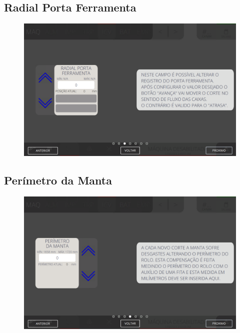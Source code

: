 \newpage
\thispagestyle{fancy}
\vspace{\fill}
\subsection{Radial Porta Ferramenta}
\begin{figure}
    \centering
    \includegraphics[width=480 px,height=300 px]{src/imagesICV/06-dryCutter/settings/e-3.png}
\end{figure}

\newpage
\thispagestyle{fancy}
\vspace{\fill}
\subsection{Perímetro da Manta}
\begin{figure}
    \centering
    \includegraphics[width=576 px,height=360 px]{src/imagesICV/06-dryCutter/settings/e-4.png}
\end{figure}

